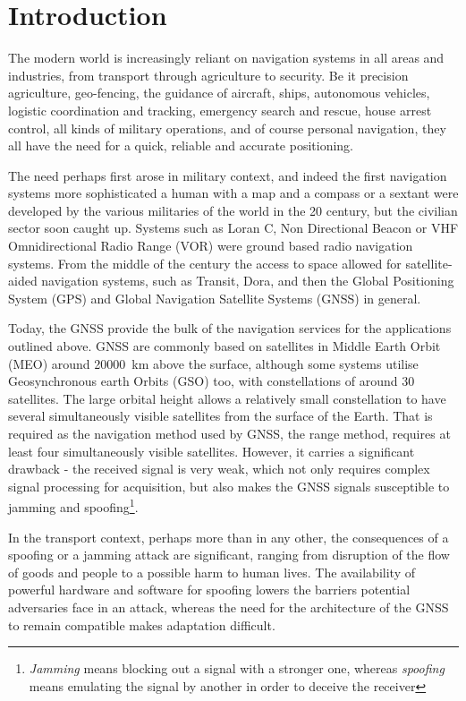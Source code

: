 \chapter{Introduction}
\label{s_int}
The modern world is increasingly reliant on navigation systems in all areas and industries, from transport through agriculture to security. Be it precision agriculture, geo-fencing, the guidance of aircraft, ships, autonomous vehicles, logistic coordination and tracking, emergency search and rescue, house arrest control, all kinds of military operations, and of course personal navigation, they all have the need for a quick, reliable and accurate positioning.

The need perhaps first arose in military context, and indeed the first navigation systems more sophisticated a human with a map and a compass or a sextant were developed by the various militaries of the world in the 20 century, but the civilian sector soon caught up. Systems such as Loran C, Non Directional Beacon or VHF Omnidirectional Radio Range (VOR) were ground based radio navigation systems. From the middle of the century the access to space allowed for satellite-aided navigation systems, such as Transit, Dora, and then the Global Positioning System (GPS) and Global Navigation Satellite Systems (GNSS) in general.

Today, the GNSS provide the bulk of the navigation services for the applications outlined above. GNSS are commonly based on satellites in Middle Earth Orbit (MEO) around \qty{20000}{km} above the surface, although some systems utilise Geosynchronous earth Orbits (GSO) too, with constellations of around 30 satellites. The large orbital height allows a relatively small constellation to have several simultaneously visible satellites from the surface of the Earth. That is required as the navigation method used by GNSS, the range method, requires at least four simultaneously visible satellites. However, it carries a significant drawback - the received signal is very weak, which not only requires complex signal processing for acquisition, but also makes the GNSS signals susceptible to jamming and spoofing\footnote{\textit{Jamming} means blocking out a signal with a stronger one, whereas \textit{spoofing} means emulating the signal by another in order to deceive the receiver}.

In the transport context, perhaps more than in any other, the consequences of a spoofing or a jamming attack are significant, ranging from disruption of the flow of goods and people to a possible harm to human lives. The availability of powerful hardware and software for spoofing lowers the barriers potential adversaries face in an attack, whereas the need for the architecture of the GNSS to remain compatible makes adaptation difficult\cite{int01}.

